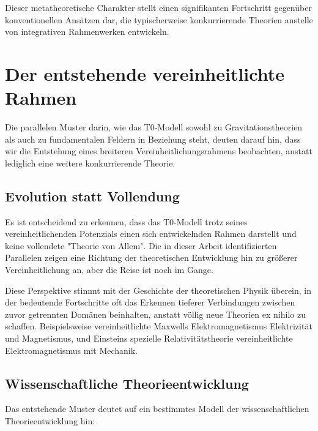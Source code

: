 \documentclass[12pt,a4paper]{article}
\begin{document}
	Dieser metatheoretische Charakter stellt einen signifikanten Fortschritt gegenüber konventionellen Ansätzen dar, die typischerweise konkurrierende Theorien anstelle von integrativen Rahmenwerken entwickeln.
	
	\section{Der entstehende vereinheitlichte Rahmen}
	\label{sec:emerging_framework}
	
	Die parallelen Muster darin, wie das T0-Modell sowohl zu Gravitationstheorien als auch zu fundamentalen Feldern in Beziehung steht, deuten darauf hin, dass wir die Entstehung eines breiteren Vereinheitlichungsrahmens beobachten, anstatt lediglich eine weitere konkurrierende Theorie.
	
	\subsection{Evolution statt Vollendung}
	\label{subsec:evolution}
	
	Es ist entscheidend zu erkennen, dass das T0-Modell trotz seines vereinheitlichenden Potenzials einen sich entwickelnden Rahmen darstellt und keine vollendete "Theorie von Allem". Die in dieser Arbeit identifizierten Parallelen zeigen eine Richtung der theoretischen Entwicklung hin zu größerer Vereinheitlichung an, aber die Reise ist noch im Gange.
	
	Diese Perspektive stimmt mit der Geschichte der theoretischen Physik überein, in der bedeutende Fortschritte oft das Erkennen tieferer Verbindungen zwischen zuvor getrennten Domänen beinhalten, anstatt völlig neue Theorien ex nihilo zu schaffen. Beispielsweise vereinheitlichte Maxwells Elektromagnetismus Elektrizität und Magnetismus, und Einsteins spezielle Relativitätstheorie vereinheitlichte Elektromagnetismus mit Mechanik.
	
	\subsection{Wissenschaftliche Theorieentwicklung}
	\label{subsec:theory_development}
	
	Das entstehende Muster deutet auf ein bestimmtes Modell der wissenschaftlichen Theorieentwicklung hin:
	
\end{document}
